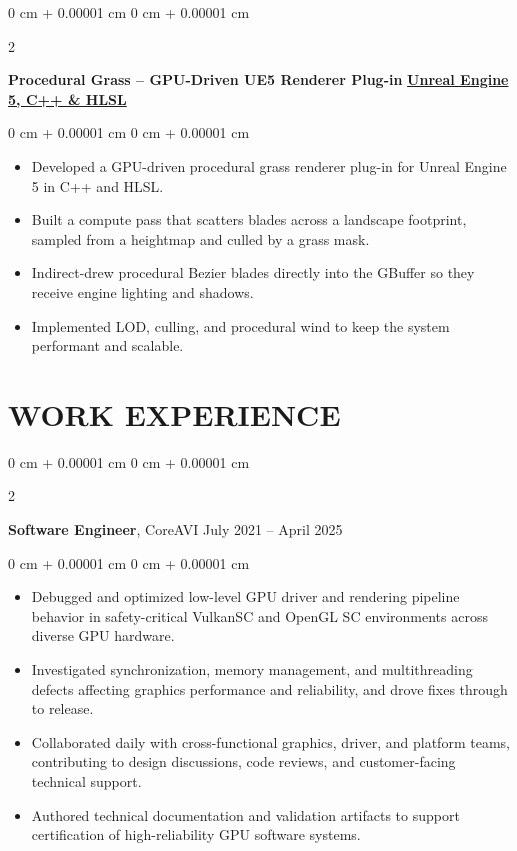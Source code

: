\documentclass[10pt, letterpaper]{article}
\newenvironment{highlights}{
    \begin{itemize}[
        topsep=0.10 cm,
        parsep=0.10 cm,
        partopsep=0pt,
        itemsep=0pt,
        leftmargin=0 cm + 10pt
    ]
}{
    \end{itemize}
} %
\newenvironment{onecolentry}{
    \begin{adjustwidth}{
        0 cm + 0.00001 cm
    }{
        0 cm + 0.00001 cm
    }
}{
    \end{adjustwidth}
} %
\newenvironment{twocolentry}[2][]{
    \onecolentry
    \def\secondColumn{#2}
    \setcolumnwidth{\fill, 4.5 cm}
    \begin{paracol}{2}
}{
    \switchcolumn \raggedleft \secondColumn
    \end{paracol}
    \endonecolentry
} %
\begin{document}
\vspace{0.2 cm}

\begin{twocolentry}{
    \textbf{\href{https://yyi.llc/completed_projects/grass/}{Unreal Engine 5, C++ \& HLSL}}
}
    \textbf{Procedural Grass -- GPU-Driven UE5 Renderer Plug-in}\end{twocolentry}

\vspace{0.10 cm}
\begin{onecolentry}
\begin{highlights}
    \item Developed a GPU-driven procedural grass renderer plug-in for Unreal Engine 5 in C++ and HLSL.
    \item Built a compute pass that scatters blades across a landscape footprint, sampled from a heightmap and culled by a grass mask.
    \item Indirect-drew procedural Bezier blades directly into the GBuffer so they receive engine lighting and shadows.
    \item Implemented LOD, culling, and procedural wind to keep the system performant and scalable.
\end{highlights}
\end{onecolentry}

\vspace{0.2 cm}




\section{WORK EXPERIENCE}
        
\begin{twocolentry}{
            July 2021 -- April 2025
        }
            \textbf{Software Engineer}, CoreAVI\end{twocolentry}

        \vspace{0.10 cm}
        \begin{onecolentry}
            \begin{highlights}
                \item Debugged and optimized low-level GPU driver and rendering pipeline behavior in safety-critical VulkanSC and OpenGL SC environments across diverse GPU hardware.
                \item Investigated synchronization, memory management, and multithreading defects affecting graphics performance and reliability, and drove fixes through to release.
                \item Collaborated daily with cross-functional graphics, driver, and platform teams, contributing to design discussions, code reviews, and customer-facing technical support.
                \item Authored technical documentation and validation artifacts to support certification of high-reliability GPU software systems.
            \end{highlights}
        \end{onecolentry}
\end{document}
